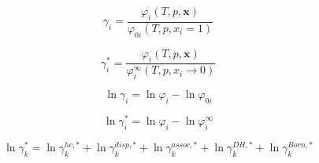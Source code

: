 \documentclass[12pt, letterpaper]{article}
\begin{document}
\begin{equation}
    \gamma_{i}
    =
    \frac{\varphi_{i}(T,p,\mathbf{x})}{\varphi_{0i}(T,p,x_{i}=1)}
    \label{eq:gamma_sym}
\end{equation}


\begin{equation}
    \gamma_{i}^{*}
    =
    \frac{\varphi_{i}(T,p,\mathbf{x})}{\varphi_{i}^{\infty}(T,p,x_{i}\to 0)}
    \label{eq:gamma_asym_inf}
\end{equation}


\begin{equation}
    \ln\gamma_{i}
    =
    \ln\varphi_{i}
    -
    \ln\varphi_{0i}
    \label{eq:lngamma_sym}
\end{equation}


\begin{equation}
    \ln\gamma_{i}^{*}
    =
    \ln\varphi_{i}
    -
    \ln\varphi_{i}^{\infty}
    \label{eq:lngamma_asym_inf}
\end{equation}


\begin{equation}
    \ln\gamma_{k}^{*}
    =
    \ln\gamma_{k}^{hc,*}
    +
    \ln\gamma_{k}^{disp,*}
    +
    \ln\gamma_{k}^{assoc,*}
    +
    \ln\gamma_{k}^{DH,*}
    +
    \ln\gamma_{k}^{Born,*}
    \label{eq:lngamma_asym_sum}
\end{equation}
\end{document}

